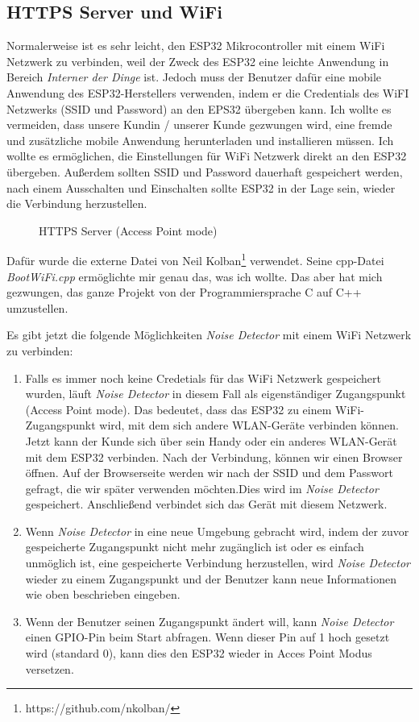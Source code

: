 \subsection{HTTPS Server und WiFi}
\label{sec:main:wifi}
Normalerweise ist es sehr leicht, den ESP32 Mikrocontroller mit einem WiFi Netzwerk zu verbinden, weil der Zweck des ESP32 eine leichte Anwendung in Bereich \textit{Interner der Dinge} ist. Jedoch muss der Benutzer dafür eine mobile Anwendung des ESP32-Herstellers verwenden, indem er die  Credentials des WiFI Netzwerks (SSID und Password) an den EPS32 übergeben kann. Ich wollte es vermeiden, dass unsere Kundin / unserer Kunde gezwungen wird, eine fremde und zusätzliche mobile Anwendung herunterladen und installieren müssen. Ich wollte es ermöglichen, die Einstellungen für WiFi Netzwerk direkt an den ESP32 übergeben. Außerdem sollten SSID und Password dauerhaft gespeichert werden, nach einem Ausschalten und Einschalten sollte ESP32 in der Lage sein, wieder die Verbindung herzustellen. 
\begin{figure}[!ht]
	\centering
	\caption{HTTPS Server (Access Point mode)}
	\label{fig:wifi}
\end{figure}
Dafür wurde die externe Datei von Neil Kolban\footnote{https://github.com/nkolban/} verwendet. Seine cpp-Datei \textit{BootWiFi.cpp} ermöglichte mir genau das, was ich wollte. Das aber hat mich gezwungen, das ganze Projekt von der Programmiersprache C auf C++ umzustellen. 

Es gibt jetzt die folgende Möglichkeiten \textit{Noise Detector}  mit einem WiFi Netzwerk zu verbinden:
\begin{enumerate}
	\item Falls es immer noch keine Credetials für das WiFi Netzwerk gespeichert wurden, läuft \textit{Noise Detector} in diesem Fall als eigenständiger Zugangspunkt (Access Point mode). Das bedeutet, dass das ESP32 zu einem WiFi-Zugangspunkt wird, mit dem sich andere WLAN-Geräte verbinden können. Jetzt kann der Kunde sich über sein Handy oder ein anderes WLAN-Gerät mit dem ESP32 verbinden. Nach der Verbindung, können wir einen Browser öffnen. Auf der Browserseite werden wir nach der SSID und dem Passwort gefragt, die wir später verwenden möchten.Dies wird im \textit{Noise Detector} gespeichert. Anschließend verbindet sich das Gerät mit diesem Netzwerk.
	
	\item Wenn \textit{Noise Detector} in eine neue Umgebung gebracht wird, indem der zuvor gespeicherte Zugangspunkt nicht mehr zugänglich ist oder es einfach unmöglich ist, eine gespeicherte Verbindung herzustellen, wird \textit{Noise Detector} wieder zu einem Zugangspunkt und der Benutzer kann neue Informationen wie oben beschrieben eingeben.
	
	\item Wenn der Benutzer seinen Zugangspunkt ändert will, kann \textit{Noise Detector} einen GPIO-Pin beim Start abfragen. Wenn dieser Pin auf 1 hoch gesetzt wird (standard 0), kann dies den ESP32 wieder in Acces Point Modus versetzen.
\end{enumerate}

